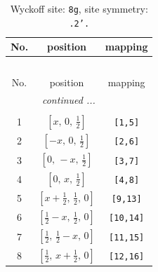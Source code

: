 \documentclass[fleqn,8pt]{jsarticle}
\begin{document}
\renewcommand{\arraystretch}{1.2}
\begin{longtable}{ccc}
\caption{Wyckoff site: {\tt 8g}, site symmetry: {\tt .2'.}}
 \\
 \hline \hline
No. & position & mapping \\ \hline \endfirsthead

\multicolumn{2}{l}{\tablename\ \thetable{}} \\
 \hline \hline
No. & position & mapping \\ \hline \endhead

 \hline \hline
\multicolumn{2}{r}{\footnotesize\it continued ...} \\ \endfoot

 \hline \hline
\multicolumn{2}{r}{} \\ \endlastfoot

1 & $\left[ x,\, 0,\, \frac{1}{2} \right]$ & {\tt [1,5]} \\ \hline
2 & $\left[ - x,\, 0,\, \frac{1}{2} \right]$ & {\tt [2,6]} \\ \hline
3 & $\left[ 0,\, - x,\, \frac{1}{2} \right]$ & {\tt [3,7]} \\ \hline
4 & $\left[ 0,\, x,\, \frac{1}{2} \right]$ & {\tt [4,8]} \\ \hline
5 & $\left[ x + \frac{1}{2},\, \frac{1}{2},\, 0 \right]$ & {\tt [9,13]} \\ \hline
6 & $\left[ \frac{1}{2} - x,\, \frac{1}{2},\, 0 \right]$ & {\tt [10,14]} \\ \hline
7 & $\left[ \frac{1}{2},\, \frac{1}{2} - x,\, 0 \right]$ & {\tt [11,15]} \\ \hline
8 & $\left[ \frac{1}{2},\, x + \frac{1}{2},\, 0 \right]$ & {\tt [12,16]} \\
\end{longtable}
\renewcommand{\arraystretch}{1.2}
\end{document}
